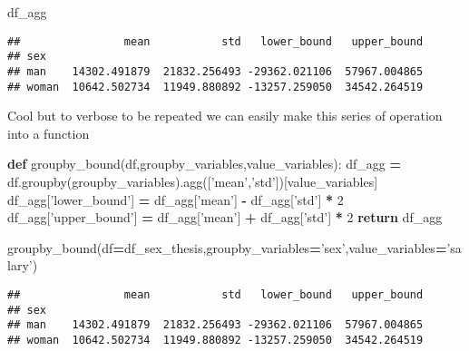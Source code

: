 \documentclass[]{article}
\newenvironment{Shaded}{\begin{snugshade}}{\end{snugshade}}
\newcommand{\ControlFlowTok}[1]{\textcolor[rgb]{0.13,0.29,0.53}{\textbf{#1}}}
\newcommand{\DecValTok}[1]{\textcolor[rgb]{0.00,0.00,0.81}{#1}}
\newcommand{\KeywordTok}[1]{\textcolor[rgb]{0.13,0.29,0.53}{\textbf{#1}}}
\newcommand{\NormalTok}[1]{#1}
\newcommand{\OperatorTok}[1]{\textcolor[rgb]{0.81,0.36,0.00}{\textbf{#1}}}
\newcommand{\StringTok}[1]{\textcolor[rgb]{0.31,0.60,0.02}{#1}}
\begin{document}
\begin{Shaded}
\begin{Highlighting}[]
\NormalTok{df_agg}
\end{Highlighting}
\end{Shaded}

\begin{verbatim}
##                mean           std   lower_bound   upper_bound
## sex                                                          
## man    14302.491879  21832.256493 -29362.021106  57967.004865
## woman  10642.502734  11949.880892 -13257.259050  34542.264519
\end{verbatim}

Cool but to verbose to be repeated we can easily make this series of
operation into a function

\begin{Shaded}
\begin{Highlighting}[]
\KeywordTok{def}\NormalTok{ groupby_bound(df,groupby_variables,value_variables):}
\NormalTok{  df_agg }\OperatorTok{=}\NormalTok{  df.groupby(groupby_variables).agg([}\StringTok{'mean'}\NormalTok{,}\StringTok{'std'}\NormalTok{])[value_variables]}
\NormalTok{  df_agg[}\StringTok{'lower_bound'}\NormalTok{] }\OperatorTok{=}\NormalTok{ df_agg[}\StringTok{'mean'}\NormalTok{] }\OperatorTok{-}\NormalTok{ df_agg[}\StringTok{'std'}\NormalTok{] }\OperatorTok{*} \DecValTok{2}
\NormalTok{  df_agg[}\StringTok{'upper_bound'}\NormalTok{] }\OperatorTok{=}\NormalTok{ df_agg[}\StringTok{'mean'}\NormalTok{] }\OperatorTok{+}\NormalTok{ df_agg[}\StringTok{'std'}\NormalTok{] }\OperatorTok{*} \DecValTok{2}
  \ControlFlowTok{return}\NormalTok{ df_agg}
\end{Highlighting}
\end{Shaded}

\begin{Shaded}
\begin{Highlighting}[]
\NormalTok{groupby_bound(df}\OperatorTok{=}\NormalTok{df_sex_thesis,groupby_variables}\OperatorTok{=}\StringTok{'sex'}\NormalTok{,value_variables}\OperatorTok{=}\StringTok{'salary'}\NormalTok{)}
\end{Highlighting}
\end{Shaded}

\begin{verbatim}
##                mean           std   lower_bound   upper_bound
## sex                                                          
## man    14302.491879  21832.256493 -29362.021106  57967.004865
## woman  10642.502734  11949.880892 -13257.259050  34542.264519
\end{verbatim}
\end{document}
